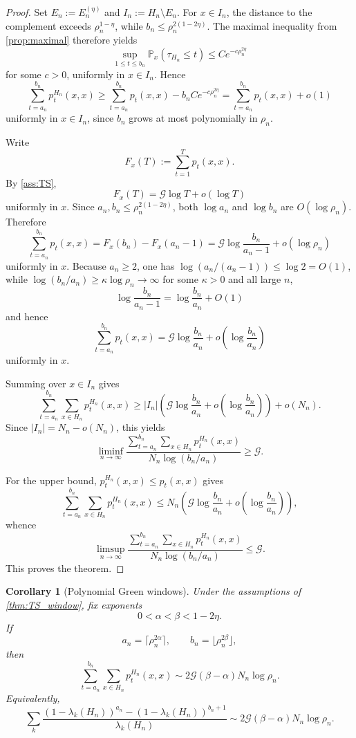 \documentclass[reqno]{amsart}
\numberwithin{equation}{section}
\newtheorem{corollary}[corollary]{Corollary}
\theoremstyle{definition}
\theoremstyle{remark}
\newcommand{\Cref}[1]{\autoref{#1}}
\newcommand{\cG}{\mathcal{G}}
\newcommand{\Prob}{\mathbb{P}}
\begin{document}
\begin{proof}
Set $E_n:=E_n^{(\eta)}$ and $I_n:=H_n\setminus E_n$. For $x\in I_n$, the distance to the complement exceeds $\rho_n^{1-\eta}$, while $b_n\le \rho_n^{2(1-2\eta)}$. The maximal inequality from \Cref{prop:maximal} therefore yields
\[
  \sup_{1\le t\le b_n}\Prob_x(\tau_{H_n}\le t)\le C e^{-c\rho_n^{2\eta}}
\]
for some $c>0$, uniformly in $x\in I_n$. Hence
\[
  \sum_{t=a_n}^{b_n} p_t^{H_n}(x,x)
  \ge
  \sum_{t=a_n}^{b_n} p_t(x,x)-b_n C e^{-c\rho_n^{2\eta}}
  =
  \sum_{t=a_n}^{b_n} p_t(x,x)+o(1)
\]
uniformly in $x\in I_n$, since $b_n$ grows at most polynomially in $\rho_n$.

Write
\[
  F_x(T):=\sum_{t=1}^{T} p_t(x,x).
\]
By \Cref{ass:TS},
\[
  F_x(T)=\cG\log T+o(\log T)
\]
uniformly in $x$. Since $a_n,b_n\le \rho_n^{2(1-2\eta)}$, both $\log a_n$ and $\log b_n$ are $O(\log \rho_n)$. Therefore
\[
  \sum_{t=a_n}^{b_n} p_t(x,x)
  =
  F_x(b_n)-F_x(a_n-1)
  =
  \cG\log\frac{b_n}{a_n-1}+o(\log \rho_n)
\]
uniformly in $x$. Because $a_n\ge 2$, one has $\log(a_n/(a_n-1))\le \log 2=O(1)$, while $\log(b_n/a_n)\ge \kappa\log \rho_n\to\infty$ for some $\kappa>0$ and all large $n$,
\[
  \log\frac{b_n}{a_n-1}
  =
  \log\frac{b_n}{a_n}+O(1)
\]
and hence
\[
  \sum_{t=a_n}^{b_n} p_t(x,x)
  =
  \cG\log\frac{b_n}{a_n}+o\!\left(\log\frac{b_n}{a_n}\right)
\]
uniformly in $x$.

Summing over $x\in I_n$ gives
\[
  \sum_{t=a_n}^{b_n}\sum_{x\in H_n} p_t^{H_n}(x,x)
  \ge
  |I_n|
  \left(
    \cG\log\frac{b_n}{a_n}
    + o\!\left(\log\frac{b_n}{a_n}\right)
  \right)
  + o(N_n).
\]
Since $|I_n|=N_n-o(N_n)$, this yields
\[
  \liminf_{n\to\infty}
  \frac{\sum_{t=a_n}^{b_n}\sum_{x\in H_n} p_t^{H_n}(x,x)}
       {N_n\log(b_n/a_n)}
  \ge \cG.
\]

For the upper bound, $p_t^{H_n}(x,x)\le p_t(x,x)$ gives
\[
  \sum_{t=a_n}^{b_n}\sum_{x\in H_n} p_t^{H_n}(x,x)
  \le
  N_n
  \left(
    \cG\log\frac{b_n}{a_n}
    + o\!\left(\log\frac{b_n}{a_n}\right)
  \right),
\]
whence
\[
  \limsup_{n\to\infty}
  \frac{\sum_{t=a_n}^{b_n}\sum_{x\in H_n} p_t^{H_n}(x,x)}
       {N_n\log(b_n/a_n)}
  \le \cG.
\]
This proves the theorem.
\end{proof}

\begin{corollary}[Polynomial Green windows]\label{cor:TS_window_polynomial}
Under the assumptions of \Cref{thm:TS_window}, fix exponents
\[
  0<\alpha<\beta<1-2\eta.
\]
If
\[
  a_n=\lceil \rho_n^{2\alpha}\rceil,
  \qquad
  b_n=\lfloor \rho_n^{2\beta}\rfloor,
\]
then
\[
  \sum_{t=a_n}^{b_n}\sum_{x\in H_n} p_t^{H_n}(x,x)
  \sim
  2\cG(\beta-\alpha)N_n\log \rho_n.
\]
Equivalently,
\[
  \sum_k
  \frac{(1-\lambda_k(H_n))^{a_n}-(1-\lambda_k(H_n))^{b_n+1}}
       {\lambda_k(H_n)}
  \sim
  2\cG(\beta-\alpha)N_n\log \rho_n.
\]
\end{corollary}
\end{document}
